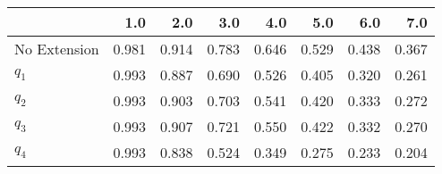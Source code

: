\begin{tabular}{lrrrrrrr}
\toprule
{} &   1.0 &   2.0 &   3.0 &   4.0 &   5.0 &   6.0 &   7.0 \\
\midrule
No Extension & 0.981 & 0.914 & 0.783 & 0.646 & 0.529 & 0.438 & 0.367 \\
$q_1$        & 0.993 & 0.887 & 0.690 & 0.526 & 0.405 & 0.320 & 0.261 \\
$q_2$        & 0.993 & 0.903 & 0.703 & 0.541 & 0.420 & 0.333 & 0.272 \\
$q_3$        & 0.993 & 0.907 & 0.721 & 0.550 & 0.422 & 0.332 & 0.270 \\
$q_4$        & 0.993 & 0.838 & 0.524 & 0.349 & 0.275 & 0.233 & 0.204 \\
\bottomrule
\end{tabular}
